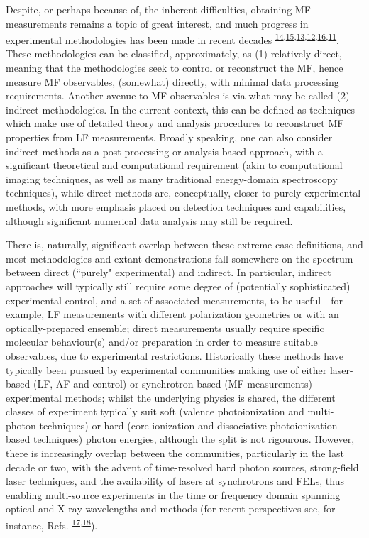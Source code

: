\documentclass[10pt]{article}
\begin{document}
Despite, or perhaps because of, the inherent difficulties, obtaining  MF measurements remains a topic of great interest, and much progress in experimental methodologies has been made in recent decades \textsuperscript{\hyperref[csl:14]{14},\hyperref[csl:15]{15},\hyperref[csl:13]{13},\hyperref[csl:12]{12},\hyperref[csl:16]{16},\hyperref[csl:11]{11}}. %
These methodologies can be classified, approximately, as (1) relatively direct, meaning that the methodologies seek to control or reconstruct the MF, hence measure MF observables, (somewhat) directly, with minimal data processing requirements. Another avenue to MF observables is via what may be called (2) indirect methodologies. In the current context, this can be defined as techniques which make use of detailed theory and analysis procedures to reconstruct MF properties from LF measurements. Broadly speaking, one can also consider indirect methods as a post-processing or analysis-based approach, with a significant theoretical and computational requirement (akin to computational imaging techniques, as well as many traditional energy-domain spectroscopy techniques), while direct methods are, conceptually, closer to purely experimental methods, with more emphasis placed on detection techniques and capabilities, although significant numerical data analysis may still be required. 

There is, naturally, significant overlap between these extreme case definitions, and most methodologies and extant demonstrations fall somewhere on the spectrum between direct (``purely" experimental) and indirect. In particular, indirect approaches will typically still require some degree of (potentially sophisticated) experimental control, and a set of associated measurements, to be useful - for example, LF measurements with different polarization geometries or with an optically-prepared ensemble; direct measurements usually require specific molecular behaviour(s) and/or preparation in order to measure suitable observables, due to experimental restrictions. Historically these methods have typically been pursued by experimental communities making use of either laser-based (LF, AF and control) or synchrotron-based (MF measurements) experimental methods; whilst the underlying physics is shared, the different classes of experiment typically suit soft (valence photoionization and multi-photon techniques) or hard (core ionization and dissociative photoionization based techniques) photon energies, although the split is not rigourous. However, there is increasingly overlap between the communities, particularly in the last decade or two, with the advent of time-resolved hard photon sources, strong-field laser techniques, and the availability of lasers at synchrotrons and FELs, thus enabling multi-source experiments in the time or frequency domain spanning optical and X-ray wavelengths and methods (for recent perspectives see, for instance, Refs. \textsuperscript{\hyperref[csl:17]{17},\hyperref[csl:18]{18}}).
\end{document}
